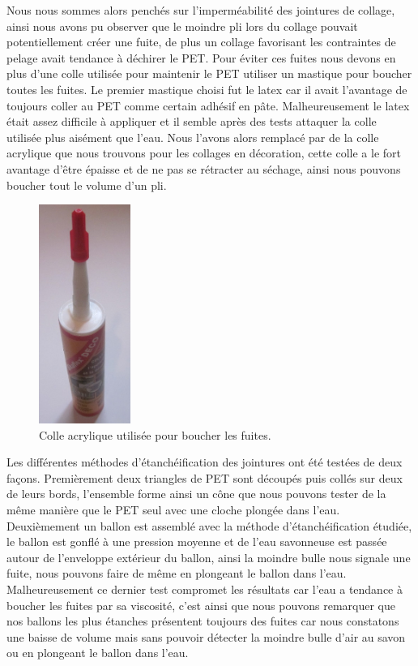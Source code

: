 \documentclass[a4paper,11pt]{article}
\begin{document}
Nous nous sommes alors penchés sur l’imperméabilité des jointures de collage, ainsi nous avons pu observer que le moindre pli lors du collage pouvait potentiellement créer une fuite, de plus un collage favorisant les contraintes de pelage avait tendance à déchirer le PET. Pour éviter ces fuites nous devons en plus d'une colle utilisée pour maintenir le PET utiliser un mastique pour boucher toutes les fuites. Le premier mastique choisi fut le latex car il avait l'avantage de toujours coller au PET comme certain adhésif en pâte. Malheureusement le latex était assez difficile à appliquer et il semble après des tests attaquer la colle utilisée plus aisément que l'eau. Nous l'avons alors remplacé par de la colle acrylique que nous trouvons pour les collages en décoration, cette colle a le fort avantage d'être épaisse et de ne pas se rétracter au séchage, ainsi nous pouvons boucher tout le volume d'un pli.

\begin{figure}[H]
 \centering
 \includegraphics[width=3cm]{../Images/colle_acrylique.JPG}
 \caption{Colle acrylique utilisée pour boucher les fuites.}
\end{figure}


Les différentes méthodes d'étanchéification des jointures ont été testées de deux façons.
Premièrement deux triangles de PET sont découpés puis collés sur deux de leurs bords, l'ensemble forme ainsi un cône que nous pouvons tester de la même manière que le PET seul avec une cloche plongée dans l'eau.
Deuxièmement un ballon est assemblé avec la méthode d'étanchéification étudiée, le ballon est gonflé à une pression moyenne et de l'eau savonneuse est passée autour de l'enveloppe extérieur du ballon, ainsi la moindre bulle nous signale une fuite, nous pouvons faire de même en plongeant le ballon dans l'eau. Malheureusement ce dernier test compromet les résultats car l'eau a tendance à boucher les fuites par sa viscosité, c'est ainsi que nous pouvons remarquer que nos ballons les plus étanches présentent toujours des fuites car nous constatons une baisse de volume mais sans pouvoir détecter la moindre bulle d'air au savon ou en plongeant le ballon dans l'eau.
\end{document}
